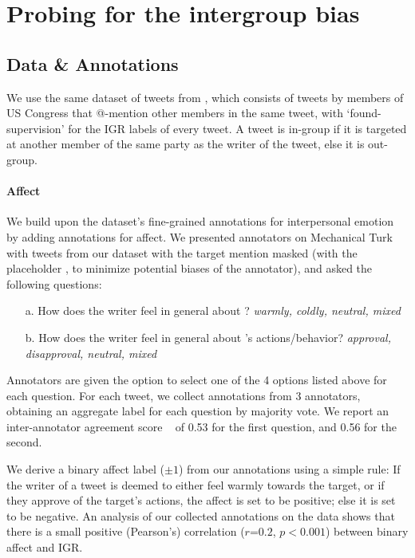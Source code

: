 \section{Probing for the intergroup bias}

\subsection{Data \& Annotations}
\label{subsec:data}

We use the same dataset of tweets from \citet{govindarajan-etal-2023-people}, which consists of tweets by members of US Congress that @-mention other members in the same tweet, with `found-supervision' for the IGR labels of every tweet. A tweet is in-group if it is targeted at another member of the same party as the writer of the tweet, else it is out-group.

\paragraph{Affect}
We build upon the dataset's fine-grained annotations for interpersonal emotion by adding annotations for affect. We presented annotators on Mechanical Turk with tweets from our dataset with the target mention masked (with the placeholder \@Doe, to minimize potential biases of the annotator), and asked the following questions:

\begin{enumerate}
    \item[a.] How does the writer feel in general about \@Doe? \emph{warmly, coldly, neutral, mixed}
    \item[b.] How does the writer feel in general about \@Doe's actions/behavior? \emph{approval, disapproval, neutral, mixed}
\end{enumerate}

Annotators are given the option to select one of the 4 options listed above for each question. For each tweet, we collect annotations from 3 annotators, obtaining an aggregate label for each question by majority vote. We report an inter-annotator agreement score ~\citep[Fleiss's kappa;][]{fleiss1971measuring} of 0.53 for the first question, and 0.56 for the second.

We derive a binary affect label ($\pm 1$) from our annotations using a simple rule: If the writer of a tweet is deemed to either feel warmly towards the target, or if they approve of the target's actions, the affect is set to be positive; else it is set to be negative. An analysis of our collected annotations on the data shows that there is a small positive (Pearson's) correlation ($r$=$0.2$, $p<0.001$) between binary affect and IGR.


